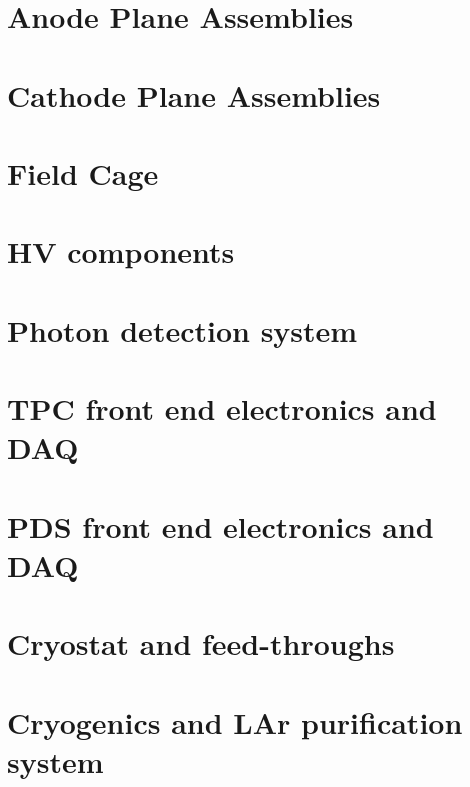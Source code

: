

\section{Anode Plane Assemblies}

\section{Cathode Plane Assemblies}

\section{Field Cage}

\section{HV components}

\section{Photon detection system}

\section{TPC front end electronics and DAQ}

\section{PDS front end electronics and DAQ}

\section{Cryostat and feed-throughs}

\section{Cryogenics and LAr purification system}

